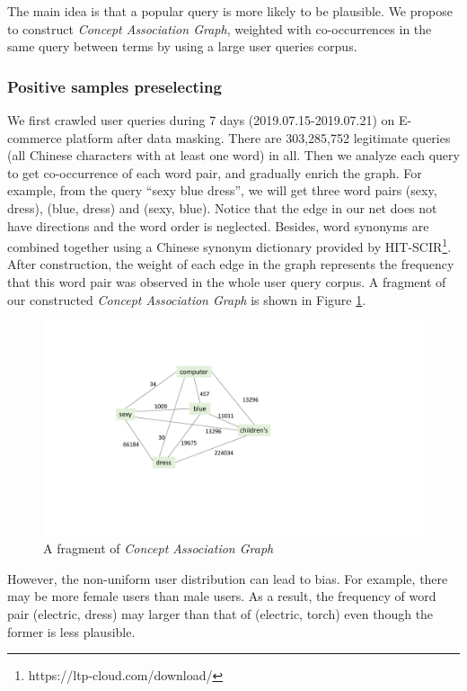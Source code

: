 The main idea is that a popular query is more likely to be plausible. 
We propose to construct \textit{Concept Association Graph}, weighted with co-occurrences in the same query between terms by using a large user queries corpus.

\subsubsection{Positive samples preselecting}
We first crawled user queries during 7 days (2019.07.15-2019.07.21) on E-commerce platform after data masking. 
There are 303,285,752 legitimate queries (all Chinese characters with at least
one word) in all. Then we analyze each query to get co-occurrence of each word pair, 
and gradually enrich the graph.
For example, from the query ``sexy blue dress'', we will get three word pairs 
(sexy, dress), (blue, dress) and (sexy, blue). Notice that the edge in our net does not have directions and the word order is neglected.
Besides, word synonyms are combined together using a Chinese synonym dictionary provided by HIT-SCIR\footnote{https://ltp-cloud.com/download/}.
After construction, the weight of each edge in the graph represents the frequency 
that this word pair was observed in the whole user query corpus. 
A fragment of our constructed \textit{Concept Association Graph} is shown in Figure \ref{fig:net}.

\begin{figure}
	\centering
	\includegraphics[width=0.8\columnwidth]{images/associationNetColor.pdf}
	\caption{A fragment of \textit{Concept Association Graph}}
	\label{fig:net}
\end{figure}

However, the non-uniform user distribution can lead to bias. For example, there may
be more female users than male users. As a result, the frequency of word pair 
(electric, dress) may larger than that of (electric, torch) even though the former
is less plausible.


